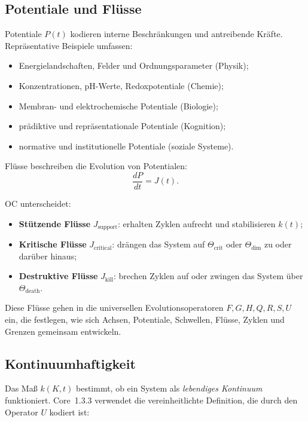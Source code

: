 \subsection{Potentiale und Flüsse}

Potentiale \(P(t)\) kodieren interne Beschränkungen und antreibende Kräfte.  
Repräsentative Beispiele umfassen:

\begin{itemize}
    \item Energielandschaften, Felder und Ordnungsparameter (Physik);
    \item Konzentrationen, pH-Werte, Redoxpotentiale (Chemie);
    \item Membran- und elektrochemische Potentiale (Biologie);
    \item prädiktive und repräsentationale Potentiale (Kognition);
    \item normative und institutionelle Potentiale (soziale Systeme).
\end{itemize}

Flüsse beschreiben die Evolution von Potentialen:
\[
\frac{dP}{dt} = J(t).
\]

OC unterscheidet:

\begin{itemize}
    \item \textbf{Stützende Flüsse} \(J_{\mathrm{support}}\): erhalten Zyklen aufrecht und stabilisieren \(k(t)\);
    \item \textbf{Kritische Flüsse} \(J_{\mathrm{critical}}\): drängen das System auf \(\Theta_{\mathrm{crit}}\) oder \(\Theta_{\mathrm{dim}}\) zu oder darüber hinaus;
    \item \textbf{Destruktive Flüsse} \(J_{\mathrm{kill}}\): brechen Zyklen auf oder zwingen das System über \(\Theta_{\mathrm{death}}\).
\end{itemize}

Diese Flüsse gehen in die universellen Evolutionsoperatoren \(F, G, H, Q, R, S, U\) ein, die festlegen, wie sich Achsen, Potentiale, Schwellen, Flüsse, Zyklen und Grenzen gemeinsam entwickeln.

\subsection{Kontinuumhaftigkeit}

Das Maß \(k(K,t)\) bestimmt, ob ein System als \emph{lebendiges Kontinuum} funktioniert.  
Core~1.3.3 verwendet die vereinheitlichte Definition, die durch den Operator \(U\) kodiert ist:

